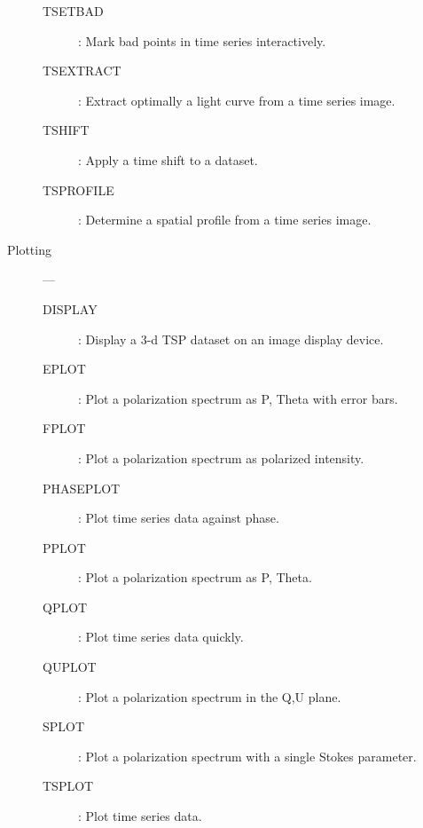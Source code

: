 \begin{description}
\begin{description}
\item [TSETBAD] : Mark bad points in time series interactively.
\item [TSEXTRACT] : Extract optimally a light curve from a time series image.
\item [TSHIFT] : Apply a time shift to a dataset.
\item [TSPROFILE] : Determine a spatial profile from a time series image.
\end{description}
\item [Plotting] ---
\begin{description}
\item [DISPLAY] : Display a 3-d TSP dataset on an image display device.
\item [EPLOT] : Plot a polarization spectrum as P, Theta with error bars.
\item [FPLOT] : Plot a polarization spectrum as polarized intensity.
\item [PHASEPLOT] : Plot time series data against phase.
\item [PPLOT] : Plot a polarization spectrum as P, Theta.
\item [QPLOT] : Plot time series data quickly.
\item [QUPLOT] : Plot a polarization spectrum in the Q,U plane.
\item [SPLOT] : Plot a polarization spectrum with a single Stokes parameter.
\item [TSPLOT] : Plot time series data.
\end{description}
\end{description}
